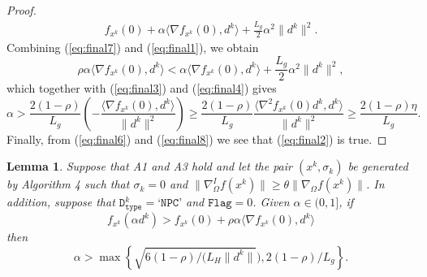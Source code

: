 \documentclass[11pt]{article}
\newtheorem{lemma}[theorem]{Lemma}
\begin{document}
\begin{proof}
\begin{eqnarray}
f_{x^{k}}(0)+\alpha\langle\nabla f_{x^{k}}(0),d^{k}\rangle+\frac{L_{g}}{2}\alpha^{2}\|d^{k}\|^{2}.
\label{eq:final7}
\end{eqnarray}
Combining (\ref{eq:final7}) and (\ref{eq:final1}), we obtain
\[
\rho\alpha\langle\nabla f_{x^{k}}(0),d^{k}\rangle<\alpha\langle\nabla f_{x^{k}}(0),d^{k}\rangle+\frac{L_{g}}{2}\alpha^{2}\|d^{k}\|^{2},
\]
which together with (\ref{eq:final3}) and (\ref{eq:final4}) gives
\begin{equation}
\alpha>\frac{2(1-\rho)}{L_{g}}\left(-\frac{\langle\nabla f_{x^{k}}(0),d^{k}\rangle}{\|d^{k}\|^{2}}\right)\geq\frac{2(1-\rho)}{L_{g}}\frac{\langle\nabla^{2}f_{x^{k}}(0)d^{k},d^{k}\rangle}{\|d^{k}\|^{2}}\geq\frac{2(1-\rho)\eta}{L_{g}}.
\label{eq:final8}
\end{equation}
Finally, from (\ref{eq:final6}) and (\ref{eq:final8}) we see that (\ref{eq:final2}) is true.
\end{proof}

\begin{lemma}
\label{lem:2.3extra}
Suppose that A1 and A3 hold and let the pair $(x^{k},\sigma_{k})$ be generated by Algorithm 4 such that $\sigma_{k}=0$ and $\|\nabla_{\Omega}^{I}f(x^{k})\|\geq\theta\|\nabla_{\Omega}f(x^{k})\|$. In addition, suppose that $\texttt{D}_{\texttt{type}}^{k}=\texttt{`NPC'}$ and $\texttt{Flag}=0$. Given $\alpha\in (0,1]$, if  
\begin{equation}
f_{x^{k}}(\alpha d^{k})>f_{x^{k}}(0)+\rho\alpha\langle\nabla f_{x^{k}}(0),d^{k}\rangle
\label{eq:2.21extra}
\end{equation}
then
\small
\begin{equation}
\alpha>\max\left\{\sqrt{6(1-\rho)/(L_{H}\|d^{k}\|}),2(1-\rho)/L_{g}\right\}.
\label{eq:2.22extra}
\end{equation}
\normalsize
\end{lemma}
\end{document}
